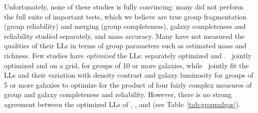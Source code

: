 Unfortunately, none of these studies is fully convincing: many did not perform
the full suite of important tests, which we believe are true group
fragmentation (group reliability) and merging (group completeness),  galaxy
completeness and reliability studied separately, and mass accuracy. Many have
not measured the qualities of their LLs in terms of group parameters such as
estimated mass and richness. Few studies have \emph{optimized} the LLs:
\cite{Eke+04} separately optimized \bperp{} and \bpar.~\cite{Berlind+06}
jointly optimized \bperp{} and \bpar{} on a grid, for groups of 10 or more
galaxies, while~\cite{Robotham+11} jointly fit the LLs and their variation with
density contrast and galaxy luminosity for groups of 5 or more galaxies to
optimize for the product of four fairly complex measures of group and galaxy
completeness and reliability. However, there is no strong agreement between the
optimized LLs of \citeauthor{Eke+04}, \citeauthor{Berlind+06}, and
\citeauthor{Robotham+11} (see Table~\ref{tab:groupalgos}).
%
